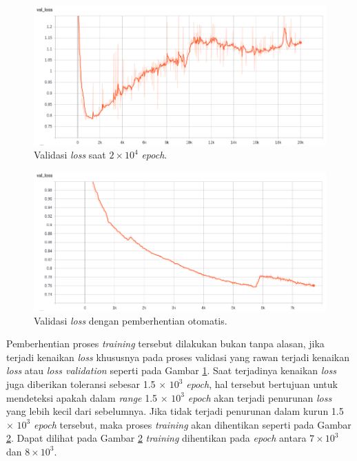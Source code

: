 \begin{figure} [!htb] \centering
	\includegraphics[scale=0.4]{img/hyperparam_val_loss_chap3.png}
	\caption{Validasi \textit{loss} saat $2 \times 10^{4}$ \textit{epoch}.}
	\label{fig:nn_dota2_val_loss_20k}
\end{figure}

\begin{figure} [!htb] \centering	
	\includegraphics[scale=0.4]{img/callback_val_loss_chap3.png}
	\caption{Validasi \textit{loss} dengan pemberhentian otomatis.}
	\label{fig:nn_dota2_val_loss_callback}
\end{figure}

Pemberhentian proses \textit{training} tersebut dilakukan bukan tanpa alasan, jika terjadi kenaikan \textit{loss} khususnya pada proses validasi yang rawan terjadi kenaikan \textit{loss} atau \textit{loss validation} seperti pada Gambar \ref{fig:nn_dota2_val_loss_20k}. Saat terjadinya kenaikan \textit{loss} juga diberikan toleransi sebesar 1.5 $\times$ $10^{3}$ \textit{epoch}, hal tersebut bertujuan untuk mendeteksi apakah dalam \textit{range} 1.5 $\times$ $10^{3}$ \textit{epoch} akan terjadi penurunan \textit{loss} yang lebih kecil dari sebelumnya. Jika tidak terjadi penurunan dalam kurun 1.5 $\times$ $10^{3}$ \textit{epoch} tersebut, maka proses \textit{training} akan dihentikan seperti pada Gambar \ref{fig:nn_dota2_val_loss_callback}. Dapat dilihat pada Gambar \ref{fig:nn_dota2_val_loss_callback} \textit{training} dihentikan pada \textit{epoch} antara $7 \times 10^{3}$ dan $8 \times 10^{3}$.
\vspace{1ex}

